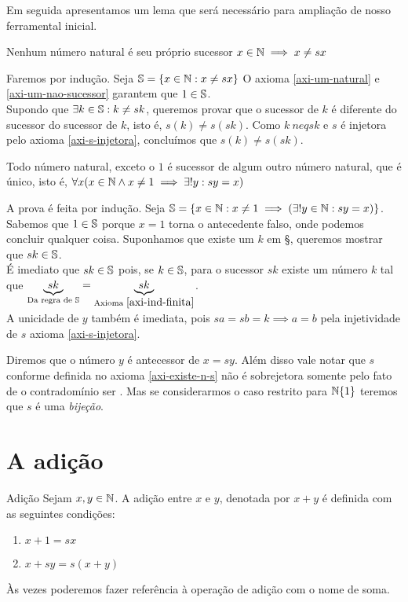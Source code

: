 \documentclass[../main.tex]{subfiles}
\begin{document}
Em seguida apresentamos um lema que será necessário para ampliação de nosso ferramental inicial.
\begin{lema}{Nenhum número natural é seu próprio sucessor}\label{n-dif-sucessor}
    $x \in \N \implies x \neq sx $
\end{lema}
\begin{dem}
    Faremos por indução. Seja $\S = \{x \in \N : x \neq sx \}$
    O axioma \ref{axi-um-natural} e \ref{axi-um-nao-sucessor} garantem que $1 \in \S$.\\
    Supondo que $\exists k \in \S : k \neq sk$, queremos provar que o sucessor de $k$ é diferente do sucessor do sucessor de $k$, isto é, $s(k) \neq s(sk)$. Como $k\ neq sk$ e $s$ é injetora pelo axioma \ref{axi-s-injetora}, concluímos que $s(k) \neq s(sk)$.
\end{dem}
\begin{teo}\label{suc-unico}
    Todo número natural, exceto o $1$ é sucessor de algum outro número natural, que é único, isto é, $\forall x (x \in \N \land x \neq 1 \implies \exists! y : sy = x)$
\end{teo}
\begin{dem}
    A prova é feita por indução. Seja $\S = \{x \in \N : x \neq 1 \implies (\exists!y \in \N : sy = x)\}$.\\
    Sabemos que $1 \in \S$ porque $x = 1$ torna o antecedente falso, onde podemos concluir qualquer coisa. Suponhamos que existe um $k$ em \S, queremos mostrar que $sk \in \S$. \\
    É imediato que $sk \in \S$ pois, se $k \in \S$, para o sucessor $sk$ existe um número $k$ tal que $\underbrace{sk}_{\text{Da regra de } \S} = \underbrace{sk}_{\text{Axioma }\ref{axi-ind-finita}}$.\\
    A unicidade de $y$ também é imediata, pois $sa = sb = k \implies a = b$ pela injetividade de $s$ axioma \ref{axi-s-injetora}.
\end{dem}
\begin{obs}
    Diremos que o número $y$ é antecessor de $x = sy$. Além disso vale notar que $s$ conforme definida no axioma \ref{axi-existe-n-s} não é sobrejetora somente pelo fato de o contradomínio ser \N. Mas se considerarmos o caso restrito para $\N \\ \{1\}$ 
    teremos que $s$ é uma \emph{bijeção}.
\end{obs}

\section{A adição}
\begin{defi}{Adição}\label{def-adicao-N}
Sejam $x, y \in \N$. A adição entre $x$ e $y$, denotada por $x + y$ é definida com as seguintes condições: 
    \begin{enumerate}[label=(\roman*)]
        \item $x + 1 = sx$
        \item $x + sy = s(x+y)$
    \end{enumerate}
\end{defi}
Às vezes poderemos fazer referência à operação de adição com o nome de soma.
\end{document}
